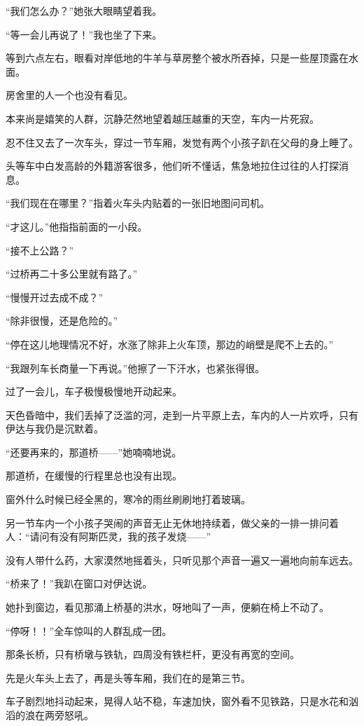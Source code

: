 \par “我们怎么办？”她张大眼睛望着我。
\par “等一会儿再说了！”我也坐了下来。
\par 等到六点左右，眼看对岸低地的牛羊与草房整个被水所吞掉，只是一些屋顶露在水面。
\par 房舍里的人一个也没有看见。
\par 本来尚是嬉笑的人群，沉静茫然地望着越压越重的天空，车内一片死寂。
\par 忍不住又去了一次车头，穿过一节车厢，发觉有两个小孩子趴在父母的身上睡了。
\par 头等车中白发高龄的外籍游客很多，他们听不懂话，焦急地拉住过往的人打探消息。
\par “我们现在在哪里？”指着火车头内贴着的一张旧地图问司机。
\par “才这儿。”他指指前面的一小段。
\par “接不上公路？”
\par “过桥再二十多公里就有路了。”
\par “慢慢开过去成不成？”
\par “除非很慢，还是危险的。”
\par “停在这儿地理情况不好，水涨了除非上火车顶，那边的峭壁是爬不上去的。”
\par “我跟列车长商量一下再说。”他擦了一下汗水，也紧张得很。
\par 过了一会儿，车子极慢极慢地开动起来。
\par 天色昏暗中，我们丢掉了泛滥的河，走到一片平原上去，车内的人一片欢呼，只有伊达与我仍是沉默着。
\par “还要再来的，那道桥——”她喃喃地说。
\par 那道桥，在缓慢的行程里总也没有出现。
\par 窗外什么时候已经全黑的，寒冷的雨丝刷刷地打着玻璃。
\par 另一节车内一个小孩子哭闹的声音无止无休地持续着，做父亲的一排一排问着人：“请问有没有阿斯匹灵，我的孩子发烧——”
\par 没有人带什么药，大家漠然地摇着头，只听见那个声音一遍又一遍地向前车远去。
\par “桥来了！”我趴在窗口对伊达说。
\par 她扑到窗边，看见那涌上桥基的洪水，呀地叫了一声，便躺在椅上不动了。
\par “停呀！！”全车惊叫的人群乱成一团。
\par 那条长桥，只有桥墩与铁轨，四周没有铁栏杆，更没有再宽的空间。
\par 先是火车头上去了，再是头等车厢，我们在的是第三节。
\par 车子剧烈地抖动起来，晃得人站不稳，车速加快，窗外看不见铁路，只是水花和汹滔的浪在两旁怒吼。
